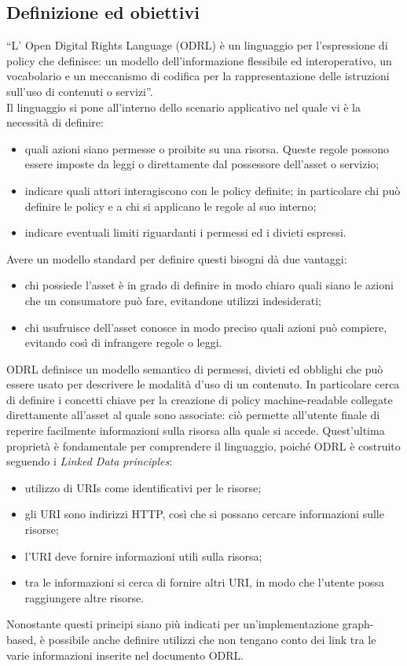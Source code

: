 \documentclass[12pt,a4paper,twoside]{book}
\begin{document}
\subsection{Definizione ed obiettivi}
``L' Open Digital Rights Language (ODRL) è un linguaggio per l'espressione di policy che definisce: un modello dell'informazione flessibile ed interoperativo, un vocabolario e un meccanismo di codifica per la rappresentazione delle istruzioni sull'uso di contenuti o servizi''\cite{ODRLinfMod}.\\
Il linguaggio si pone all'interno dello scenario applicativo nel quale vi è la necessità di definire:
\begin{itemize}
	\item quali azioni siano permesse o proibite su una risorsa. Queste regole possono essere imposte da leggi o direttamente dal possessore dell'asset o servizio;
	\item indicare quali attori interagiscono con le policy definite; in particolare chi può definire le policy e a chi si applicano le regole al suo interno;
	\item indicare eventuali limiti riguardanti i permessi ed i divieti espressi.
\end{itemize}
Avere un modello standard per definire questi bisogni dà due vantaggi:
\begin{itemize}
	\item chi possiede l'asset è in grado di definire in modo chiaro quali siano le azioni che un consumatore può fare, evitandone utilizzi indesiderati;
	\item chi usufruisce dell'asset conosce in modo preciso quali azioni può compiere, evitando così di infrangere regole o leggi.
\end{itemize}
ODRL definisce un modello semantico di permessi, divieti ed obblighi che può essere usato per descrivere le modalità d'uso di un contenuto. In particolare cerca di definire i concetti chiave per la creazione di policy machine-readable collegate direttamente all'asset al quale sono associate: ciò permette all'utente finale di reperire facilmente informazioni sulla risorsa alla quale si accede. Quest'ultima proprietà è fondamentale per comprendere il linguaggio, poiché ODRL è costruito seguendo i \textit{Linked Data principles}\cite{LinkedDataInfo}:
\begin{itemize}\label{linkedDataPrinc}
\item utilizzo di URIs come identificativi per le risorse;
\item gli URI sono indirizzi HTTP, così che si possano cercare informazioni sulle risorse;
\item l'URI deve fornire informazioni utili sulla risorsa;
\item tra le informazioni si cerca di fornire altri URI, in modo che l'utente possa raggiungere altre risorse.
\end{itemize}
Nonostante questi principi siano più indicati per un'implementazione graph-based, è possibile anche definire utilizzi che non tengano conto dei link tra le varie informazioni inserite nel documento ODRL.
\end{document}
